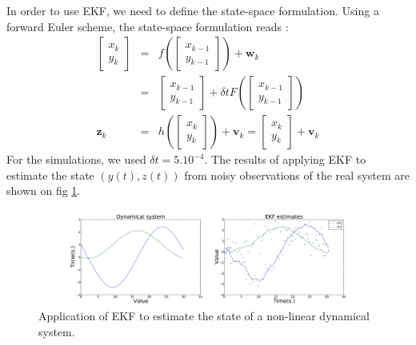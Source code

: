 \documentclass[10pt,oneside]{scrartcl}
\newcommand\vecteur[1]{\boldsymbol#1}
\begin{document}
In order to use EKF, we need to define the state-space
formulation. Using a forward Euler scheme, the state-space formulation reads :
\begin{eqnarray}
\nonumber \begin{bmatrix}
x_k \\
y_k
\end{bmatrix} &=& f( \begin{bmatrix}
x_{k-1} \\
y_{k-1}
\end{bmatrix}) + \vecteur{w}_k \\
\nonumber  &=& \begin{bmatrix}
x_{k-1} \\
y_{k-1}
\end{bmatrix} + \delta t F(\begin{bmatrix}
x_{k-1} \\
y_{k-1}
\end{bmatrix})\\
\vecteur{z}_k &=& h( \begin{bmatrix}
x_{k} \\
y_{k}
\end{bmatrix}) + \vecteur{v}_k = \begin{bmatrix}
x_{k} \\
y_{k}
\end{bmatrix} + \vecteur{v}_k
\end{eqnarray}
For the simulations, we used $\delta t = 5.10^{-4}$. The results of applying EKF
to estimate the state $(y(t),z(t))$ from noisy observations of the
real system are shown on fig \ref{fig:ekf_ex1}.

\begin{figure}
\center \includegraphics[width=0.9\linewidth]{Examples/EKF-Ex/EKF-ex1.pdf}
\caption{\label{fig:ekf_ex1} Application of EKF to estimate the state
  of a non-linear dynamical system.}
\end{figure}


\end{document}

